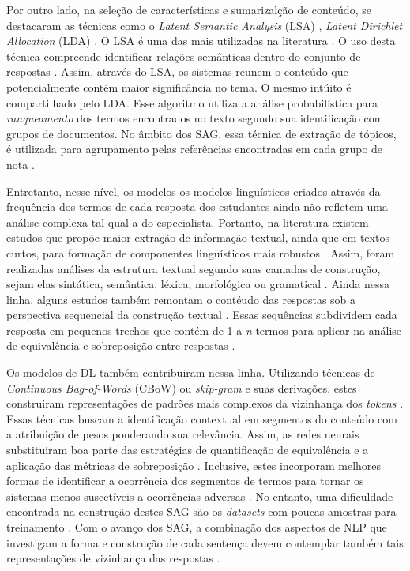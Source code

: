 Por outro lado, na seleção de características e sumarizalção de conteúdo, se destacaram as técnicas como o \textit{Latent Semantic Analysis} (LSA) \cite{landauer1998}, \textit{Latent Dirichlet Allocation} (LDA) \cite{blei2003}. O LSA é uma das mais utilizadas na literatura \cite{basu2013, sahu2020}. O uso desta técnica compreende identificar relações semânticas dentro do conjunto de respostas \cite{mohler2009}. Assim, através do LSA, os sistemas reunem o conteúdo que potencialmente contém maior significância no tema. O mesmo intúito é compartilhado pelo LDA. Esse algoritmo utiliza a análise probabilística para \textit{ranqueamento} dos termos encontrados no texto segundo sua identificação com grupos de documentos. No âmbito dos SAG, essa técnica de extração de tópicos, é utilizada para agrupamento pelas referências encontradas em cada grupo de nota \cite{basu2013, zhang2022}.

Entretanto, nesse nível, os modelos os modelos linguísticos criados através da frequência dos termos de cada resposta dos estudantes ainda não refletem uma análise complexa tal qual a do especialista. Portanto, na literatura existem estudos que propõe maior extração de informação textual, ainda que em textos curtos, para formação de componentes linguísticos mais robustos \cite{saha2018, zesch2018}. Assim, foram realizadas análises da estrutura textual segundo suas camadas de construção, sejam elas sintática, semântica, léxica, morfológica ou gramatical \cite{ramachandran2015b, roy2016}. Ainda nessa linha, alguns estudos também remontam o contéudo das respostas sob a perspectiva sequencial da construção textual \cite{kumar2017}. Essas sequências subdividem cada resposta em pequenos trechos que contém de 1 a \textit{n} termos para aplicar na análise de equivalência e sobreposição entre respostas \cite{jimenez2013, sakaguchi2015, sultan2016}.

Os modelos de DL também contribuiram nessa linha. Utilizando técnicas de \textit{Continuous Bag-of-Words} (CBoW) ou \textit{skip-gram} e suas derivações, estes construiram representações de padrões mais complexos da vizinhança dos \textit{tokens} \cite{mikolov2013}. Essas técnicas buscam a identificação contextual em segmentos do conteúdo com a atribuição de pesos ponderando sua relevância. Assim, as redes neurais substituiram boa parte das estratégias de quantificação de equivalência e a aplicação das métricas de sobreposição \cite{haller2022}. Inclusive, estes incorporam melhores formas de identificar a ocorrência dos segmentos de termos para tornar os sistemas menos suscetíveis a ocorrências adversas \cite{camus2020}. No entanto, uma dificuldade encontrada na construção destes SAG são os \textit{datasets} com poucas amostras para treinamento \cite{bonthu2021}. Com o avanço dos SAG, a combinação dos aspectos de NLP que investigam a forma e construção de cada sentença devem contemplar também tais representações de vizinhança das respostas \cite{riordan2019, kumar2019}.


